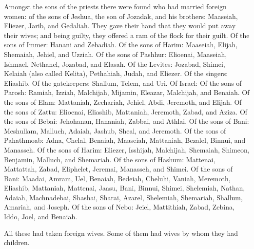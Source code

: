  Amongst the sons of the priests there were found who had
married foreign women: of the sons of Jeshua, the son of Jozadak, and
his brothers: Maaseiah, Eliezer, Jarib, and Gedaliah. 
They gave their hand that they would put away their wives; and being
guilty, they offered a ram of the flock for their guilt. 
Of the sons of Immer: Hanani and Zebadiah.  Of the sons
of Harim: Maaseiah, Elijah, Shemaiah, Jehiel, and Uzziah.
 Of the sons of Pashhur: Elioenai, Maaseiah, Ishmael,
Nethanel, Jozabad, and Elasah.  Of the Levites: Jozabad,
Shimei, Kelaiah (also called Kelita), Pethahiah, Judah, and Eliezer.
 Of the singers: Eliashib. Of the gatekeepers: Shallum,
Telem, and Uri.  Of Israel: Of the sons of Parosh:
Ramiah, Izziah, Malchijah, Mijamin, Eleazar, Malchijah, and Benaiah.
 Of the sons of Elam: Mattaniah, Zechariah, Jehiel, Abdi,
Jeremoth, and Elijah.  Of the sons of Zattu: Elioenai,
Eliashib, Mattaniah, Jeremoth, Zabad, and Aziza.  Of the
sons of Bebai: Jehohanan, Hananiah, Zabbai, and Athlai. 
Of the sons of Bani: Meshullam, Malluch, Adaiah, Jashub, Sheal, and
Jeremoth.  Of the sons of Pahathmoab: Adna, Chelal,
Benaiah, Maaseiah, Mattaniah, Bezalel, Binnui, and Manasseh.
 Of the sons of Harim: Eliezer, Isshijah, Malchijah,
Shemaiah, Shimeon,  Benjamin, Malluch, and Shemariah.
 Of the sons of Hashum: Mattenai, Mattattah, Zabad,
Eliphelet, Jeremai, Manasseh, and Shimei.  Of the sons of
Bani: Maadai, Amram, Uel,  Benaiah, Bedeiah, Cheluhi,
 Vaniah, Meremoth, Eliashib,  Mattaniah,
Mattenai, Jaasu,  Bani, Binnui, Shimei, 
Shelemiah, Nathan, Adaiah,  Machnadebai, Shashai, Sharai,
 Azarel, Shelemiah, Shemariah,  Shallum,
Amariah, and Joseph.  Of the sons of Nebo: Jeiel,
Mattithiah, Zabad, Zebina, Iddo, Joel, and Benaiah.

 All these had taken foreign wives. Some of them had
wives by whom they had children.
